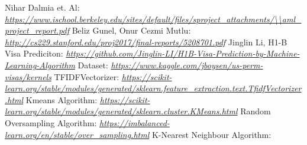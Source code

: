 \documentclass[conference]{IEEEtran}
\begin{document}
\begin{thebibliography}{00}
 Nihar Dalmia et. Al: \textit{\url{https://www.ischool.berkeley.edu/sites/default/files/sproject\_attachments/\\aml\_project\_report.pdf}}
 Beliz Gunel, Onur Cezmi Mutlu: \textit{\url{http://cs229.stanford.edu/proj2017/final-reports/5208701.pdf}}
 Jinglin Li, H1-B Visa Prediciton: \textit{\url{https://github.com/Jinglin-LI/H1B-Visa-Prediction-by-Machine-Learning-Algorithm}}
Dataset:  \textit{\url{https://www.kaggle.com/jboysen/us-perm-visas/kernels}}
TFIDFVectorizer: \textit{\url{https://scikit-learn.org/stable/modules/generated/sklearn.feature_extraction.text.TfidfVectorizer.html}}
Kmeans Algorithm: \textit{\url{https://scikit-learn.org/stable/modules/generated/sklearn.cluster.KMeans.html}}
Random Oversampling Algorithm: \textit{\url{https://imbalanced-learn.org/en/stable/over_sampling.html}}
K-Nearest Neighbour Algorithm: \textit{}
\end{thebibliography}
\vspace{12pt}
\end{document}
